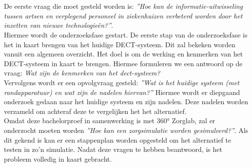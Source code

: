 \section{}%
\label{sec:prep}%
De eerste vraag die moet gesteld worden is: \textit{''Hoe kan de informatie-uitwisseling tussen artsen en verplegend personeel in ziekenhuizen verbeterd worden door het inzetten van nieuwe technologieën?''}.\\ 

Hiermee wordt de onderzoeksfase gestart. De eerste stap van de onderzoeksfase is het in kaart brengen van het huidige DECT-systeem. Dit zal bekeken worden vanuit een algemeen overzicht. Het doel is om de werking en kenmerken van het DECT-systeem in kaart te brengen. Hiermee formuleren we een antwoord op de vraag: \textit{Wat zijn de kenmerken van het \gls{dect}-systeem?}\\
Vervolgens wordt er een opvolgvraag gesteld: \textit{''Wat is het huidige systeem (met randapparatuur) en wat zijn de nadelen hiervan?''} Hiermee wordt er diepgaand onderzoek gedaan naar het huidige systeem en zijn nadelen. Deze nadelen worden verzameld om achteraf deze te vergelijken het het alternatief.\\ Omdat deze bachelorproef in samenwerking is met 360° Zorglab, zal er onderzocht moeten worden \textit{''Hoe kan een zorgsimulatie worden gesimuleerd?''}. Als dit gekend is kan er een stappenplan worden opgesteld om het alternatief te testen in zo'n simulatie.
Nadat deze vragen te hebben beantwoord, is het probleem volledig in kaart gebracht.\\



